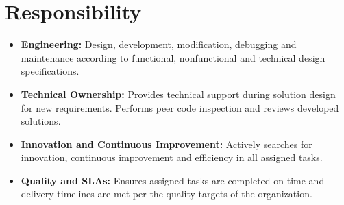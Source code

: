 \documentclass[a4paper,12pt]{article}
\begin{document}
\section{Responsibility}
\begin{itemize}[nosep,after=\strut, leftmargin=1em, itemsep=3pt]
	\item \textbf{Engineering:} Design, development, modification, debugging and maintenance according to functional, non­functional and technical design specifications.
	\item \textbf{Technical Ownership:} Provides technical support during solution design for new requirements. Performs peer code inspection and reviews developed solutions.
	\item \textbf{Innovation and Continuous Improvement:} Actively searches for innovation, continuous improvement and efficiency in all assigned tasks.
	\item \textbf{Quality and SLAs:} Ensures assigned tasks are completed on time and delivery timelines are met per the quality targets of the organization.
\end{itemize}

\end{document}

